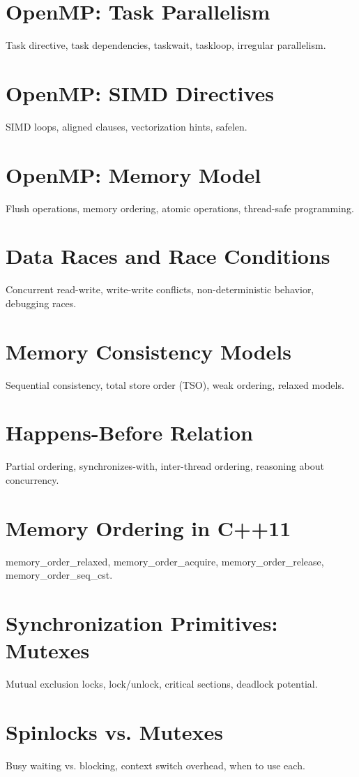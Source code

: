 \chapter{OpenMP: Task Parallelism}
Task directive, task dependencies, taskwait, taskloop, irregular parallelism.

\chapter{OpenMP: SIMD Directives}
SIMD loops, aligned clauses, vectorization hints, safelen.

\chapter{OpenMP: Memory Model}
Flush operations, memory ordering, atomic operations, thread-safe programming.

\chapter{Data Races and Race Conditions}
Concurrent read-write, write-write conflicts, non-deterministic behavior, debugging races.

\chapter{Memory Consistency Models}
Sequential consistency, total store order (TSO), weak ordering, relaxed models.

\chapter{Happens-Before Relation}
Partial ordering, synchronizes-with, inter-thread ordering, reasoning about concurrency.

\chapter{Memory Ordering in C++11}
memory\_order\_relaxed, memory\_order\_acquire, memory\_order\_release, memory\_order\_seq\_cst.

\chapter{Synchronization Primitives: Mutexes}
Mutual exclusion locks, lock/unlock, critical sections, deadlock potential.

\chapter{Spinlocks vs. Mutexes}
Busy waiting vs. blocking, context switch overhead, when to use each.

